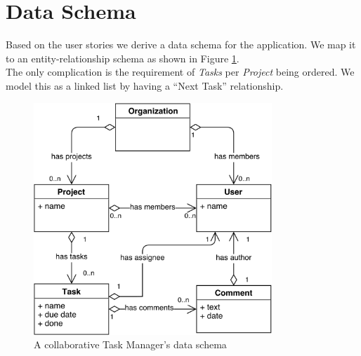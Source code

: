 \section{Data Schema}
Based on the user stories we derive a data schema for the application.
We map it to an entity-relationship schema as shown in Figure \ref{fig:tasks-data-schema}.\\
The only complication is the requirement of \emph{Tasks} per \emph{Project} being ordered.
We model this as a linked list by having a ``Next Task'' relationship.

\begin{figure}
\centering
\includegraphics[width=0.8\textwidth]{img/tasks-schema}
\caption{A collaborative Task Manager's data schema}
\label{fig:tasks-data-schema}
\end{figure}
